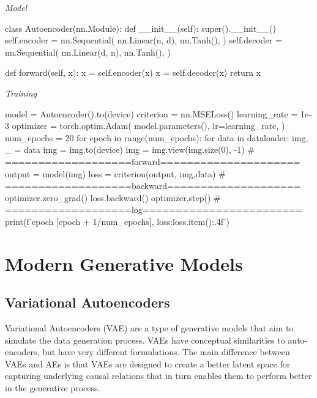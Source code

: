 \documentclass{article}
\begin{document}
\begin{minipage}{\textwidth}
\vspace{8pt}
\emph{Model}
\vspace{8pt}
\begin{ipythonnb}
class Autoencoder(nn.Module):
    def __init__(self):
        super().__init__()
        self.encoder = nn.Sequential(
            nn.Linear(n, d),
            nn.Tanh(),
        )
        self.decoder = nn.Sequential(
            nn.Linear(d, n),
            nn.Tanh(),
        )

    def forward(self, x):
        x = self.encoder(x)
        x = self.decoder(x)
        return x
\end{ipythonnb}
\end{minipage}

\begin{minipage}{\textwidth}
\vspace{8pt}
\emph{Training}
\vspace{8pt}
\begin{ipythonnb}
model = Autoencoder().to(device)
criterion = nn.MSELoss()
learning_rate = 1e-3
optimizer = torch.optim.Adam(
    model.parameters(),
    lr=learning_rate,
)
num_epochs = 20
for epoch in range(num_epochs):
    for data in dataloader:
        img, _ = data
        img = img.to(device)
        img = img.view(img.size(0), -1)
        # ===================forward=====================
        output = model(img)  
        loss = criterion(output, img.data)
        # ===================backward====================
        optimizer.zero_grad()
        loss.backward()
        optimizer.step()
    # ===================log========================
    print(f'epoch [{epoch + 1}/{num_epochs}], loss:{loss.item():.4f}')
\end{ipythonnb}
\end{minipage}

\section{Modern Generative Models}
\subsection{Variational Autoencoders}
Variational Autoencoders (VAE) are a type of generative models that aim to simulate the data generation process. VAEs have conceptual similarities to auto-encoders, but have very different formulations. The main difference between VAEs and AEs is that VAEs are designed to create a better latent space for capturing underlying causal relations that in turn enables them to perform better in the generative process.
\end{document}
